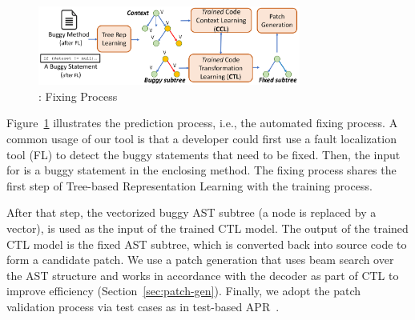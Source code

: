 \begin{figure}[t]
	\centering
	\includegraphics[width=3.4in]{graphs/overview-predict-4.png}
	\caption{{\tool}: Fixing Process}
        \vspace{-3pt}
	\label{overview-fixing}
\end{figure}

Figure~\ref{overview-fixing} illustrates the prediction process, i.e.,
the automated fixing process. A common usage of our tool is that
a developer could first use a fault localization tool
(FL) to detect the buggy statements that need to be fixed. Then, the
input for {\tool} is a buggy statement in the enclosing method.
The fixing process shares the first step of Tree-based Representation
Learning with the training process.

After that step, the vectorized buggy AST subtree (a node is replaced
by a vector), is used as the input of the trained CTL model. The
output of the trained CTL model is the fixed AST subtree, which is
converted back into source code to form a candidate patch. We use a
patch generation that uses beam search over the AST structure and
works in accordance with the decoder as part of CTL to improve
efficiency (Section~\ref{sec:patch-gen}). Finally, we adopt the patch
validation process via test cases as in test-based APR~\cite{icse20}.




